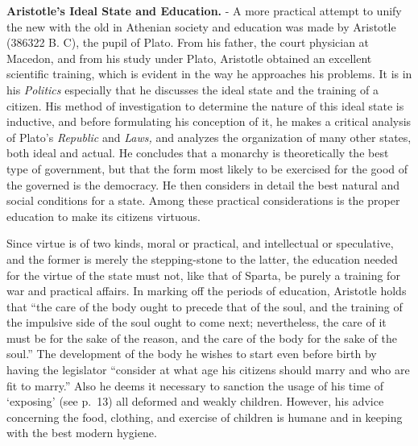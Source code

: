\documentclass[
]{book}
\begin{document}
\textbf{Aristotle's Ideal State and Education.} - A more practical attempt to unify the new with the old in Athenian society and education was made by Aristotle (386322 B. C), the pupil of Plato. From his father, the court physician at Macedon, and from his study under Plato, Aristotle obtained an excellent scientific training, which is evident in the way he approaches his problems. It is in his \emph{Politics} especially that he discusses the ideal state and the training of a citizen. His method of investigation to determine the nature of this ideal state is inductive, and before formulating his conception of it, he makes a critical analysis of Plato's \emph{Republic} and \emph{Laws,} and analyzes the organization of many other states, both ideal and actual. He concludes that a monarchy is theoretically the best type of government, but that the form most likely to be exercised for the good of the governed is the democracy. He then considers in detail the best natural and social conditions for a state. Among these practical considerations is the proper education to make its citizens virtuous.

Since virtue is of two kinds, moral or practical, and intellectual or speculative, and the former is merely the stepping-stone to the latter, the education needed for the virtue of the state must not, like that of Sparta, be purely a training for war and practical affairs. In marking off the periods of education, Aristotle holds that ``the care of the body ought to precede that of the soul, and the training of the impulsive side of the soul ought to come next; nevertheless, the care of it must be for the sake of the reason, and the care of the body for the sake of the soul.'' The development of the body he wishes to start even before birth by having the legislator ``consider at what age his citizens should marry and who are fit to marry.'' Also he deems it necessary to sanction the usage of his time of `exposing' (see p.~13) all deformed and weakly children. However, his advice concerning the food, clothing, and exercise of children is humane and in keeping with the best modern hygiene.
\end{document}
